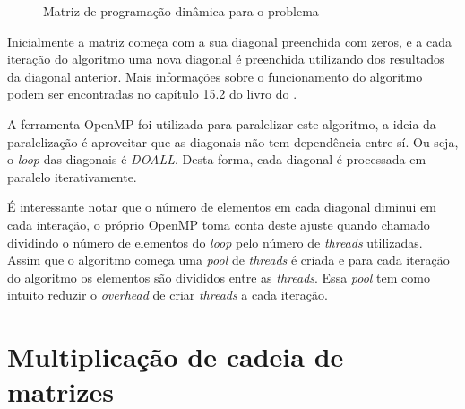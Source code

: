 \documentclass[12pt,openright,oneside,chapter=TITLE,section=TITLE,
    brazil]{utfpr-pg}
\begin{document}
\begin{figure}[h]
	\centering	
	{%
		\setlength{\fboxsep}{0pt}%
		\setlength{\fboxrule}{1pt}%
	}%
	\vspace{-0.3cm}
	\caption{Matriz de programação dinâmica para o problema} \label{fig:tabelaPerentizacao}
	\vspace{-0.3cm}
\end{figure}

Inicialmente a matriz começa com a sua diagonal preenchida com zeros, e a cada iteração do algoritmo uma nova diagonal é preenchida utilizando dos resultados da diagonal anterior. Mais informações sobre o funcionamento do algoritmo podem ser encontradas no capítulo 15.2 do livro do .

A ferramenta OpenMP foi utilizada para paralelizar este algoritmo, a ideia da paralelização é aproveitar que as diagonais não tem dependência entre sí. Ou seja, o \emph{loop} das diagonais é \emph{DOALL}. Desta forma, cada diagonal é processada em paralelo iterativamente.

 É interessante notar que o número de elementos em cada diagonal diminui em cada interação, o próprio OpenMP toma conta deste ajuste quando chamado dividindo o número de elementos do \emph{loop} pelo número de \emph{threads} utilizadas. Assim que o algoritmo começa uma \emph{pool} de \emph{threads} é criada e para cada iteração do algoritmo os elementos são divididos entre as \emph{threads}. Essa \emph{pool} tem como intuito reduzir o \emph{overhead} de criar \emph{threads} a cada iteração.


\section{Multiplicação de cadeia de matrizes}
\vspace{-0.7cm}
\end{document}
